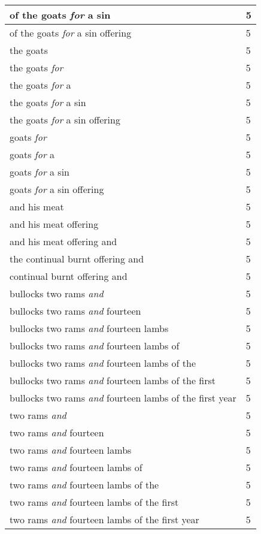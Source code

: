 \begin{center}
\begin{longtable}{|p{3.0in}|p{0.5in}|}
of the goats \emph{for} a sin & 5\\ \hline 
of the goats \emph{for} a sin offering & 5\\ \hline 
the goats & 5\\ \hline 
the goats \emph{for} & 5\\ \hline 
the goats \emph{for} a & 5\\ \hline 
the goats \emph{for} a sin & 5\\ \hline 
the goats \emph{for} a sin offering & 5\\ \hline 
goats \emph{for} & 5\\ \hline 
goats \emph{for} a & 5\\ \hline 
goats \emph{for} a sin & 5\\ \hline 
goats \emph{for} a sin offering & 5\\ \hline 
and his meat & 5\\ \hline 
and his meat offering & 5\\ \hline 
and his meat offering and & 5\\ \hline 
the continual burnt offering and & 5\\ \hline 
continual burnt offering and & 5\\ \hline 
bullocks two rams \emph{and} & 5\\ \hline 
bullocks two rams \emph{and} fourteen & 5\\ \hline 
bullocks two rams \emph{and} fourteen lambs & 5\\ \hline 
bullocks two rams \emph{and} fourteen lambs of & 5\\ \hline 
bullocks two rams \emph{and} fourteen lambs of the & 5\\ \hline 
bullocks two rams \emph{and} fourteen lambs of the first & 5\\ \hline 
bullocks two rams \emph{and} fourteen lambs of the first year & 5\\ \hline 
two rams \emph{and} & 5\\ \hline 
two rams \emph{and} fourteen & 5\\ \hline 
two rams \emph{and} fourteen lambs & 5\\ \hline 
two rams \emph{and} fourteen lambs of & 5\\ \hline 
two rams \emph{and} fourteen lambs of the & 5\\ \hline 
two rams \emph{and} fourteen lambs of the first & 5\\ \hline 
two rams \emph{and} fourteen lambs of the first year & 5\\ \hline 

\end{longtable}
\end{center}
